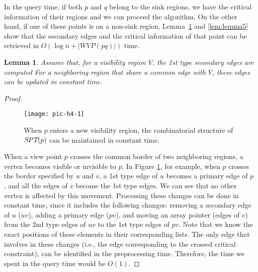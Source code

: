 \documentclass[5p]{elsarticle}
\newtheorem{lemma}[theorem]{Lemma}
\def\SPT{\mbox{\it{SPT}}}
\begin{document}
In the query time, if both $p$ and $q$ belong to the sink regions, we have the 
critical information of their regions and we can proceed the algorithm. 
On the other hand, if one of these points is on a non-sink region, 
Lemma~\ref{lem:lemma4} and \ref{lem:lemma5} show that the secondary edges and 
the critical information of that point can be retrieved in $O(\log n + |WVP(pq)|)$ time.

\begin{lemma} \label{lem:lemma4}
Assume that, for a visibility region $V$, the 1st type secondary edges are computed
For a neighboring region that share a common edge with $V$, these edges can be updated
in constant time.
\end{lemma}
\begin{proof}
\begin{figure}[h]
  \centering
  \texttt{[image: pic-h4-1]}   \caption{When $p$ enters a new visibility region, 
  the combinatorial structure of $\SPT(p)$ can be maintained in constant time.}
  \label{fig:h4}
\end{figure}
When a view point $p$ crosses the common border of two neighboring regions, 
a vertex becomes visible or invisible \cite{bose} to $p$. 
In Figure \ref{fig:h4}, for example, when $p$ crosses the
border specified by $u$ and $v$, a 1st type edge of $u$
becomes a primary edge of $p$, and all the edges of $v$ become the 1st type edges.
We can see that no other vertex is affected by this movement.
Processing these changes
can be done in constant time, since it includes the following changes:
removing a secondary edge of $u$ ($uv$), adding a primary edge ($pv$), 
and moving an array pointer (edges of $v$) from the 2nd type edges of $uv$ to the 1st 
type edges of $pv$. Note that we know the exact positions of these elements in their corresponding 
lists. The only edge that involves in these changes (i.e., the edge 
corresponding to the crossed critical constraint), can be identified in the
preprocessing time. Therefore, the time we spent in the query time would be $O(1)$.
\end{proof}
\end{document}
